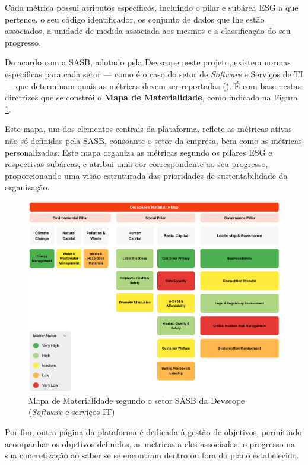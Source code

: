 Cada métrica possui atributos específicos, incluindo o pilar e subárea ESG a que pertence, o seu código identificador, os conjunto de dados que lhe estão associados, a unidade de medida associada aos mesmos e a classificação do seu progresso.

De acordo com a \gls{SASB}, adotado pela Devscope neste projeto, existem normas específicas para cada setor — como é o caso do setor de \textit{Software} e Serviços de TI — que determinam quais as métricas devem ser reportadas (\cite{SASBSector2025}). É com base nestas diretrizes que se constrói o \textbf{Mapa de Materialidade}, como indicado na Figura \ref{fig:materiality_map}.

Este mapa, um dos elementos centrais da plataforma, reflete as métricas ativas não só definidas pela \gls{SASB}, consoante o setor da empresa, bem como as métricas personalizadas. Este mapa organiza as métricas segundo os pilares ESG e respectivas subáreas, e atribui uma cor correspondente ao seu progresso, proporcionando uma visão estruturada das prioridades de sustentabilidade da organização.

\begin{figure}[h]
    \centering
    \includegraphics[width=\linewidth]{frontmatter/assets/mapa-materialidade.png}
    \caption{Mapa de Materialidade segundo o setor SASB da Devscope (\textit{Software} e serviços IT)}
    \label{fig:materiality_map}
\end{figure}

Por fim, outra página da plataforma é dedicada à gestão de objetivos, permitindo acompanhar os objetivos definidos, as métricas a eles associadas, o progresso na sua concretização ao saber se se encontram dentro ou fora do plano estabelecido.

